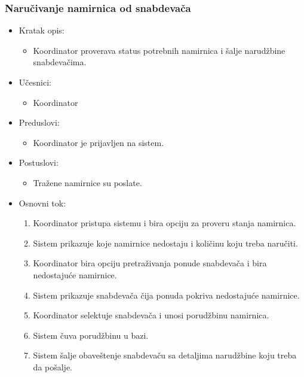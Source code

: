 

\subsubsection{Naručivanje namirnica od snabdevača}


\begin{itemize}
	\item Kratak opis:
		\begin{itemize}
			\item Koordinator proverava status potrebnih namirnica i šalje narudžbine snabdevačima.
		\end{itemize}
	\item Učesnici:
		\begin{itemize}
		    \item Koordinator
		\end{itemize}
	\item Preduslovi:
		\begin{itemize}
		    \item Koordinator je prijavljen na sistem.
		\end{itemize}
	\item Postuslovi:
		\begin{itemize}
			\item Tražene namirnice su poslate.
	\end{itemize}
	\item Osnovni tok:
		\begin{enumerate}
            \item Koordinator pristupa sistemu i bira opciju za proveru stanja namirnica.
           \item Sistem prikazuje koje namirnice nedostaju i količinu koju treba naručiti.
           \item Koordinator bira opciju pretraživanja ponude snabdevača i bira nedostajuće namirnice.
            \item Sistem prikazuje snabdevača čija ponuda pokriva nedostajuće namirnice. 
             \item  Koordinator selektuje snabdevača i unosi porudžbinu namirnica.
              \item Sistem čuva porudžbinu u bazi.
             \item Sistem šalje obaveštenje snabdevaču sa detaljima narudžbine koju treba da pošalje.
            

\end{enumerate}
\end{itemize}
